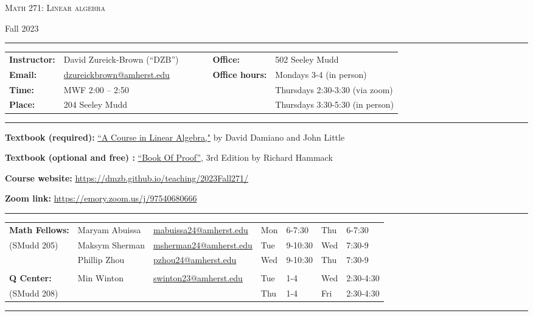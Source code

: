 \documentclass[12pt]{article}
\begin{document}
\begin{center}
{\Large \textsc{Math 271: Linear algebra}}
\end{center}
\begin{center}
Fall 2023
\end{center}

\hrule \smallskip

\noindent \begin{tabular}{@{}llcccll}
\textbf{Instructor:} & David Zureick-Brown (``DZB'') & & & & \textbf{Office:} & 502 Seeley Mudd \\
 \textbf{Email:} & \href{mailto: dzureickbrown@amherst.edu}{dzureickbrown@amherst.edu} & & & & \textbf{Office hours:} & Mondays 3-4 (in person)\\
 \textbf{Time:} & MWF 2:00 -- 2:50 & & & & &Thursdays 2:30-3:30 (via zoom) \\
 \textbf{Place:} & 204 Seeley Mudd & & & & & Thursdays 3:30-5:30 (in person)
\end{tabular}

\smallskip \hrule \medskip

\noindent\textbf{Textbook (required):}
\href{https://www.amazon.com/Course-Linear-Algebra-Dover-Mathematics/dp/0486469085}
{``A Course in Linear Algebra,"} by David Damiano and John Little
\medskip

\noindent\textbf{Textbook (optional and free) :}
\href{https://www.people.vcu.edu/~rhammack/BookOfProof/}
{``Book Of Proof'',} 3rd Edition by Richard Hammack
\medskip

\noindent\textbf{Course website:} \url{https://dmzb.github.io/teaching/2023Fall271/}
\medskip

\noindent\textbf{Zoom link:} \url{https://emory.zoom.us/j/97540680666}

\medskip \hrule \smallskip

\noindent \begin{tabular}{@{}lllllll}

\textbf{Math Fellows:} & Maryam Abuissa & \href{mailto: mabuissa24@amherst.edu}{mabuissa24@amherst.edu} & Mon &6-7:30 & Thu & 6-7:30 \\
(SMudd 205) & Maksym Sherman & \href{mailto: msherman24@amherst.edu}{msherman24@amherst.edu} & Tue & 9-10:30 & Wed & 7:30-9 \\
& Phillip Zhou & \href{mailto: pzhou24@amherst.edu}{pzhou24@amherst.edu} & Wed &9-10:30 & Thu & 7:30-9 \\
 & & & & & &\\ 
\textbf{Q Center:}& Min Winton & \href{mailto: swinton23@amherst.edu}{swinton23@amherst.edu} &Tue &1-4 & Wed &2:30-4:30 \\
(SMudd 208)&&&Thu&1-4&Fri&2:30-4:30
\end{tabular}
\smallskip \hrule \medskip          
\end{document}
